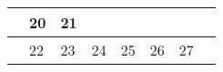 {\begin{tabularx}{\linewidth}{|l!{\vrule width \myLenLineThicknessThick}*{7}{@{}X@{}|}}
       & 
    
      
      
        \begin{minipage}[t]{6mm}\centering{}20\end{minipage}
      
       & 
    
      
      
        \begin{minipage}[t]{6mm}\centering{}21\end{minipage}
      
      
        \\  \hline 
      
    
  
  
  
  \hyperlink{week-2027-12}{} &
    
      
      
        \begin{minipage}[t]{6mm}\centering{}22\end{minipage}
      
       & 
    
      
      
        \begin{minipage}[t]{6mm}\centering{}23\end{minipage}
      
       & 
    
      
      
        \begin{minipage}[t]{6mm}\centering{}24\end{minipage}
      
       & 
    
      
      
        \begin{minipage}[t]{6mm}\centering{}25\end{minipage}
      
       & 
    
      
      
        \begin{minipage}[t]{6mm}\centering{}26\end{minipage}
      
       & 
    
      
      
        \begin{minipage}[t]{6mm}\centering{}27\end{minipage}
      

\end{tabularx}}
